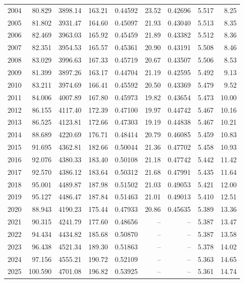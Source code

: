 \documentclass[reprint,aps,pra,longbibliography,floatfix]{revtex4-2}
\begin{document}
\begin{minipage}{\textwidth}
\begin{ruledtabular}
\begin{tabular}{rrrrrrrrr}
2004 & 80.829 & 3898.14 & 163.21 & 0.44592 & 23.52 & 0.42696 & 5.517 & 8.25 \\
2005 & 81.802 & 3931.47 & 164.60 & 0.45097 & 21.93 & 0.43040 & 5.513 & 8.35 \\
2006 & 82.469 & 3963.03 & 165.92 & 0.45459 & 21.89 & 0.43382 & 5.512 & 8.36 \\
2007 & 82.351 & 3954.53 & 165.57 & 0.45361 & 20.90 & 0.43191 & 5.508 & 8.46 \\
2008 & 83.029 & 3996.63 & 167.33 & 0.45719 & 20.67 & 0.43507 & 5.506 & 8.53 \\
2009 & 81.399 & 3897.26 & 163.17 & 0.44704 & 21.19 & 0.42595 & 5.492 & 9.13 \\
2010 & 83.211 & 3974.69 & 166.41 & 0.45592 & 20.50 & 0.43369 & 5.479 & 9.52 \\
2011 & 84.006 & 4007.89 & 167.80 & 0.45973 & 19.82 & 0.43654 & 5.473 & 10.00 \\
2012 & 86.155 & 4117.40 & 172.39 & 0.47100 & 19.97 & 0.44742 & 5.467 & 10.16 \\
2013 & 86.525 & 4123.81 & 172.66 & 0.47303 & 19.19 & 0.44838 & 5.467 & 10.21 \\
2014 & 88.689 & 4220.69 & 176.71 & 0.48414 & 20.79 & 0.46085 & 5.459 & 10.83 \\
2015 & 91.695 & 4362.81 & 182.66 & 0.50044 & 21.36 & 0.47702 & 5.458 & 10.93 \\
2016 & 92.076 & 4380.33 & 183.40 & 0.50108 & 21.18 & 0.47742 & 5.442 & 11.42 \\
2017 & 92.570 & 4386.12 & 183.64 & 0.50312 & 21.68 & 0.47991 & 5.435 & 11.64 \\
2018 & 95.001 & 4489.87 & 187.98 & 0.51502 & 21.03 & 0.49053 & 5.421 & 12.00 \\
2019 & 95.127 & 4486.47 & 187.84 & 0.51463 & 21.01 & 0.49013 & 5.410 & 12.51 \\
2020 & 88.943 & 4190.23 & 175.44 & 0.47933 & 20.86 & 0.45635 & 5.389 & 13.36 \\
2021 & 90.315 & 4241.79 & 177.60 & 0.48656 & -- & -- & 5.387 & 13.47 \\
2022 & 94.434 & 4434.82 & 185.68 & 0.50870 & -- & -- & 5.387 & 13.58 \\
2023 & 96.438 & 4521.34 & 189.30 & 0.51863 & -- & -- & 5.378 & 14.02 \\
2024 & 97.156 & 4555.21 & 190.72 & 0.52109 & -- & -- & 5.363 & 14.65 \\
2025 & 100.590 & 4701.08 & 196.82 & 0.53925 & -- & -- & 5.361 & 14.74 \\
\end{tabular}\end{ruledtabular}
\par\endgroup
\end{minipage}
\end{document}
